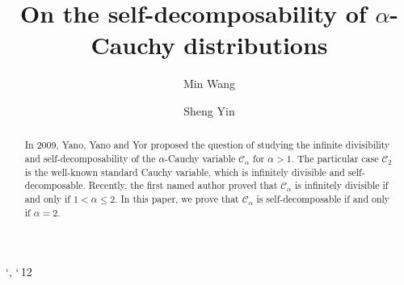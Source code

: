 \documentclass[12pt]{amsart}
\begin{document}
\newcommand*\pFqskip{8mu}
\catcode`,\active
\newcommand*\pFq{\begingroup
        \catcode`\,\active
        \def ,{\mskip\pFqskip\relax}%
        \dopFq
}
\catcode`\,12
\def\dopFq#1#2#3#4#5{%
        {}_{#1}F_{#2}\biggl[\genfrac..{0pt}{}{#3}{#4};#5\biggr]%
        \endgroup
}



\def\ii{{\rm i}}



\title[Non-SD of alpha Cauchy]{On the self-decomposability of $\alpha$-Cauchy distributions}

\author[M.~Wang]{Min Wang}

\address{School of Mathematics and Statistics, Wuhan University of Technology,  Wuhan, 430063, China}


\author[S. ~Yin]{Sheng Yin}

\address{Harbin Institute of Technology, China}




\begin{abstract} 
   In 2009, Yano, Yano and Yor proposed the question of studying the infinite divisibility and self-decomposability of  the $\alpha$-Cauchy variable $\mathcal{C}_\alpha$ for $\alpha > 1$. The particular case $\mathcal{C}_2$ is the well-known standard Cauchy variable, which is infinitely divisible and self-decomposable. Recently, the first named author proved that $\mathcal{C}_\alpha$ is infinitely divisible if and only if $1 < \alpha \leq 2$. In this paper, we prove that $\mathcal{C}_\alpha$ is self-decomposable if and only if $\alpha = 2$. 
\end{abstract}

\maketitle
\end{document}
